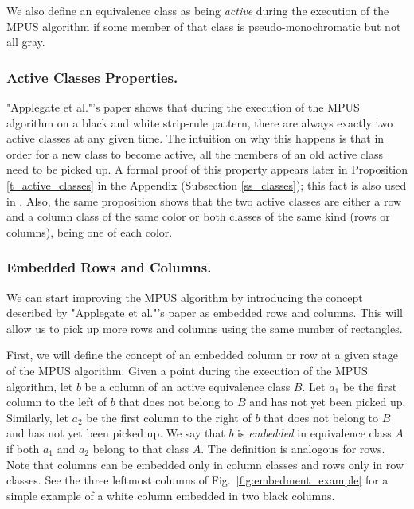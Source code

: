 
We also define an equivalence class as being {\em active} during the execution of the MPUS algorithm if some member of that class is pseudo-monochromatic
but not all gray.

\subsubsection{Active Classes Properties.}
"Applegate et al."'s paper shows that during the execution of the MPUS algorithm on a black and white strip-rule pattern, there are always exactly two active classes at any given time.
The intuition on why this happens is that in order for a new class to become active, all the members of an old active class need to be picked up.
A formal proof of this property appears later in
Proposition \ref{t_active_classes} in the Appendix
(Subsection \ref{ss_classes});
this fact is also used in \cite{ACJKLW07}.
Also, the same proposition shows that
the two active classes are either a row and a column
class of the same color or both classes of the same kind (rows or columns),
 being one of each color.

\subsubsection{Embedded Rows and Columns.}
We can start improving the MPUS algorithm by introducing the concept described by "Applegate et al."'s paper as embedded rows and columns. This will allow us to pick up more rows and columns using the same number of rectangles.

First, we will define the concept of an embedded column or row at a given stage of the MPUS algorithm.
Given a point during the execution of the MPUS algorithm,
let $b$ be a column of an active equivalence class $B$.
Let $a_{1}$ be the first column to the left of $b$ that does not belong to $B$ and has not yet been picked up.
Similarly, let $a_{2}$ be the first column to the right of $b$ that does not belong to $B$ and has not yet been picked up.
We say that $b$ is {\em embedded}
 in equivalence class $A$ if both $a_{1}$ and $a_{2}$ belong to that class $A$. The definition is analogous for rows. Note that columns can be embedded only in column classes and rows only in row classes. See the three leftmost columns of Fig.~\ref{fig:embedment_example} for a simple example of a white column embedded in two black columns.

